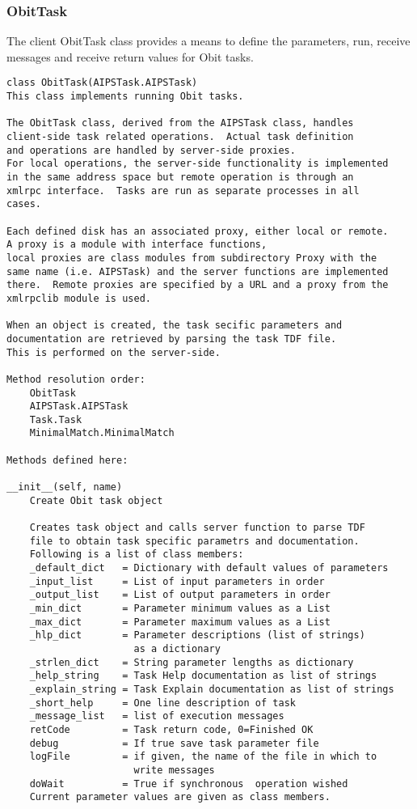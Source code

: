 \documentclass[11pt]{report}
\begin{document}
\subsubsection{ObitTask}
The client ObitTask class provides a means to define the parameters,
run, receive messages and receive return values for Obit tasks.
\begin{verbatim}
class ObitTask(AIPSTask.AIPSTask)
This class implements running Obit tasks.

The ObitTask class, derived from the AIPSTask class, handles
client-side task related operations.  Actual task definition
and operations are handled by server-side proxies.
For local operations, the server-side functionality is implemented
in the same address space but remote operation is through an
xmlrpc interface.  Tasks are run as separate processes in all
cases.

Each defined disk has an associated proxy, either local or remote.
A proxy is a module with interface functions,
local proxies are class modules from subdirectory Proxy with the
same name (i.e. AIPSTask) and the server functions are implemented
there.  Remote proxies are specified by a URL and a proxy from the
xmlrpclib module is used.

When an object is created, the task secific parameters and
documentation are retrieved by parsing the task TDF file.
This is performed on the server-side.

Method resolution order:
    ObitTask
    AIPSTask.AIPSTask
    Task.Task
    MinimalMatch.MinimalMatch

Methods defined here:

__init__(self, name)
    Create Obit task object
    
    Creates task object and calls server function to parse TDF
    file to obtain task specific parametrs and documentation.
    Following is a list of class members:
    _default_dict   = Dictionary with default values of parameters
    _input_list     = List of input parameters in order
    _output_list    = List of output parameters in order
    _min_dict       = Parameter minimum values as a List
    _max_dict       = Parameter maximum values as a List
    _hlp_dict       = Parameter descriptions (list of strings)
                      as a dictionary
    _strlen_dict    = String parameter lengths as dictionary
    _help_string    = Task Help documentation as list of strings
    _explain_string = Task Explain documentation as list of strings
    _short_help     = One line description of task
    _message_list   = list of execution messages
    retCode         = Task return code, 0=Finished OK
    debug           = If true save task parameter file
    logFile         = if given, the name of the file in which to
                      write messages
    doWait          = True if synchronous  operation wished
    Current parameter values are given as class members.


\end{verbatim}
\end{document}

